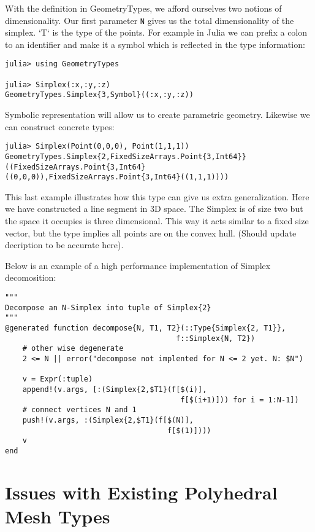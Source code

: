 With the definition in GeometryTypes, we afford ourselves two notions of
dimensionality. Our first parameter \texttt{N} gives us the total dimensionality
of the simplex. `T` is the type of the points. For example in Julia we can
prefix a colon to an identifier and make it a symbol which is reflected
in the type information:

\begin{lstlisting}
julia> using GeometryTypes

julia> Simplex(:x,:y,:z)
GeometryTypes.Simplex{3,Symbol}((:x,:y,:z))
\end{lstlisting}

Symbolic representation will allow us to create parametric geometry.
Likewise we can construct concrete types:

\begin{lstlisting}
julia> Simplex(Point(0,0,0), Point(1,1,1))
GeometryTypes.Simplex{2,FixedSizeArrays.Point{3,Int64}}((FixedSizeArrays.Point{3,Int64}((0,0,0)),FixedSizeArrays.Point{3,Int64}((1,1,1))))
\end{lstlisting}

This last example illustrates how this type can give us extra generalization.
Here we have constructed a line segment in 3D space. The Simplex is of
size two but the space it occupies is three dimensional. This way it acts
similar to a fixed size vector, but the type implies all points are on the
convex hull. (Should update decription to be accurate here).

Below is an example of a high performance implementation of Simplex decomosition:

\begin{lstlisting}
"""
Decompose an N-Simplex into tuple of Simplex{2}
"""
@generated function decompose{N, T1, T2}(::Type{Simplex{2, T1}},
                                       f::Simplex{N, T2})
    # other wise degenerate
    2 <= N || error("decompose not implented for N <= 2 yet. N: $N")

    v = Expr(:tuple)
    append!(v.args, [:(Simplex{2,$T1}(f[$(i)],
                                        f[$(i+1)])) for i = 1:N-1])
    # connect vertices N and 1
    push!(v.args, :(Simplex{2,$T1}(f[$(N)],
                                     f[$(1)])))
    v
end
\end{lstlisting}

\section{Issues with Existing Polyhedral Mesh Types}

